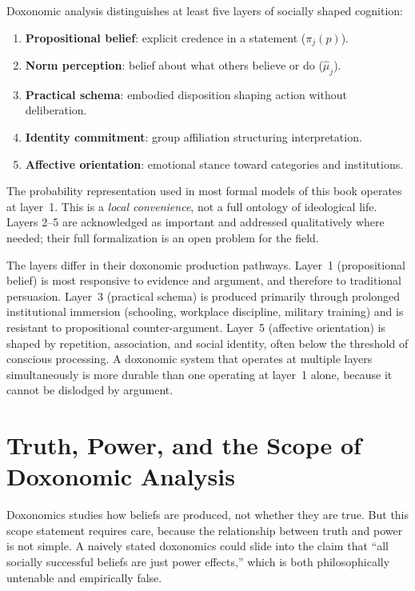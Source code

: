 \begin{principle}
\label{prin:layered-ontology}
Doxonomic analysis distinguishes at least five layers of socially shaped cognition:
\begin{enumerate}[nosep]
  \item \textbf{Propositional belief}: explicit credence in a statement ($\pi_j(p)$).
  \item \textbf{Norm perception}: belief about what others believe or do ($\hat{\mu}_j$).
  \item \textbf{Practical schema}: embodied disposition shaping action without deliberation.
  \item \textbf{Identity commitment}: group affiliation structuring interpretation.
  \item \textbf{Affective orientation}: emotional stance toward categories and institutions.
\end{enumerate}
The probability representation used in most formal models of this book operates at layer~1.
This is a \emph{local convenience}, not a full ontology of ideological life.
Layers 2--5 are acknowledged as important and addressed qualitatively where needed; their full formalization is an open problem for the field.
\end{principle}

\begin{remark}
The layers differ in their doxonomic production pathways.
Layer~1 (propositional belief) is most responsive to evidence and argument, and therefore to traditional persuasion.
Layer~3 (practical schema) is produced primarily through prolonged institutional immersion (schooling, workplace discipline, military training) and is resistant to propositional counter-argument.
Layer~5 (affective orientation) is shaped by repetition, association, and social identity, often below the threshold of conscious processing.
A doxonomic system that operates at multiple layers simultaneously is more durable than one operating at layer~1 alone, because it cannot be dislodged by argument.
\end{remark}


\section{Truth, Power, and the Scope of Doxonomic Analysis}
\label{sec:ch2-truth-power}

Doxonomics studies how beliefs are produced, not whether they are true.
But this scope statement requires care, because the relationship between truth and power is not simple.
A naively stated doxonomics could slide into the claim that ``all socially successful beliefs are just power effects,'' which is both philosophically untenable and empirically false.


